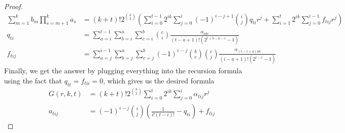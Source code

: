 \documentclass{article}
\begin{document}
\begin{proof}
\begin{align*}
\sum_{m=1}^{k} b_{m} \prod_{s=m+1}^{k}a_s
&= 
  (k+t)!
  2^{\binom{k}{2}}
  \left(
    \sum_{i=0}^{t-1}
      2^{ik}
      \sum_{j=0}^{i}
         (-1)^{i-j+1}
         \binom{i}{j}
         q_{ti}
         r^j
     + \sum_{i=1}^{t}
      2^{ik}
      \sum_{j=0}^{i-1}
         f_{tij}
         r^j
  \right)\\
q_{ti}
&=
 \sum_{a=i}^{t-1}
   \sum_{b=i}^{a}
     \sum_{c=i}^{b}
       \binom{c}{i}
       \frac{\alpha_{abc}}
            {(t-a+1)!(2^{t+b-a-i}-1)} \\
f_{tij}
&=
  \sum_{a=j}^{i-1}
    \sum_{b=j}^{a}
      \sum_{c=j}^{b}
        (-1)^{c-j}
        \binom{b}{c}
        \binom{c}{j}
        \frac{\alpha_{(t-i+a)ab}}
             {(i-a+1)!(2^{i-c}-1)}
\end{align*}
Finally, we get the answer by plugging everything into the recursion formula using the fact that $q_{tt} = f_{tii} = 0$, which gives us the desired formula
\begin{align*}
G(r, k, t)
&=
  (k+t)!2^{\binom{k}{2}}
  \sum_{i=0}^{t}
    2^{ik}
    \sum_{j=0}^{i}
      \alpha_{tij}
      r^j \\
a_{tij}
&=
  (-1)^{i-j}
  \binom{i}{j}
  \left(
    \frac{1}{i!(t-i)!}
    - q_{ti}
  \right)
  +f_{tij}
\end{align*}
\end{proof}
\end{document}
